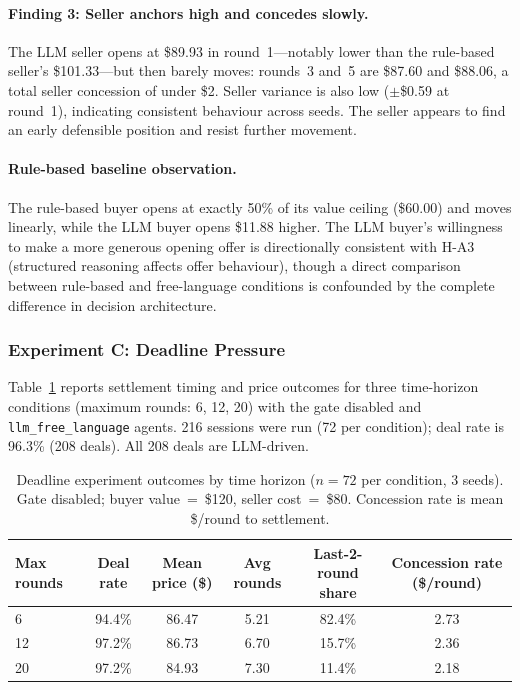 \paragraph{Finding 3: Seller anchors high and concedes slowly.}
The LLM seller opens at \$89.93 in round~1---notably lower than the rule-based seller's \$101.33---but then barely moves: rounds~3 and~5 are \$87.60 and \$88.06, a total seller concession of under \$2.  Seller variance is also low ($\pm$\$0.59 at round~1), indicating consistent behaviour across seeds.  The seller appears to find an early defensible position and resist further movement.

\paragraph{Rule-based baseline observation.}
The rule-based buyer opens at exactly 50\% of its value ceiling (\$60.00) and moves linearly, while the LLM buyer opens \$11.88 higher.  The LLM buyer's willingness to make a more generous opening offer is directionally consistent with H-A3 (structured reasoning affects offer behaviour), though a direct comparison between rule-based and free-language conditions is confounded by the complete difference in decision architecture.

\subsubsection{Experiment C: Deadline Pressure}
\label{sec:results-deadline}

Table~\ref{tab:deadline} reports settlement timing and price outcomes for three time-horizon conditions (maximum rounds: 6, 12, 20) with the gate disabled and \texttt{llm\_free\_language} agents.  216 sessions were run (72 per condition); deal rate is 96.3\% (208 deals).  All 208 deals are LLM-driven.

\begin{table}[ht]
\centering
\caption{Deadline experiment outcomes by time horizon ($n = 72$ per condition, 3 seeds).  Gate disabled; buyer value~=~\$120, seller cost~=~\$80.  Concession rate is mean \$/round to settlement.}
\label{tab:deadline}
\begin{tabular}{@{}lccccc@{}}
\toprule
Max rounds & Deal rate & Mean price (\$) & Avg rounds & Last-2-round share & Concession rate (\$/round) \\
\midrule
6  & 94.4\% & 86.47 & 5.21 & 82.4\% & 2.73 \\
12 & 97.2\% & 86.73 & 6.70 & 15.7\% & 2.36 \\
20 & 97.2\% & 84.93 & 7.30 & 11.4\% & 2.18 \\
\bottomrule
\end{tabular}
\end{table}

